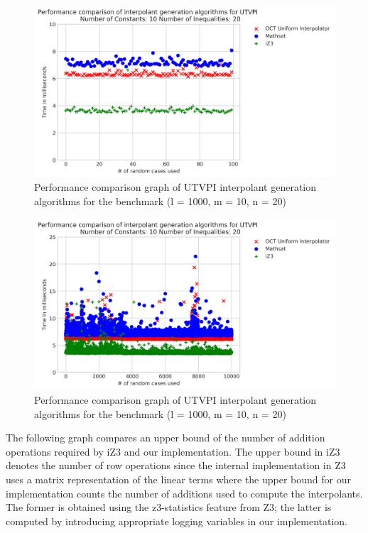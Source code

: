 \begin{figure}[!ht]
  \centering
  \includegraphics[scale=0.6]{figures/octi_performance_graph_10_20_100.png}
  \caption{Performance comparison graph of UTVPI interpolant generation
  algorithms for the benchmark (l = 1000, m = 10, n = 20)} 

  \label{performance_graph_oct_3}
\end{figure}

\begin{figure}[!ht]
  \centering
  \includegraphics[scale=0.6]{figures/octi_performance_graph_10_20_10000.png}
  \caption{Performance comparison graph of UTVPI interpolant generation
  algorithms for the benchmark (l = 1000, m = 10, n = 20)} 

  \label{performance_graph_oct_4}
\end{figure}

The following graph compares an upper bound of the number of 
addition operations required by iZ3 and our implementation. 
The upper bound in iZ3 denotes the number of row 
operations since the
internal implementation in Z3 uses a matrix representation
of the linear terms where the upper bound for our implementation
counts the number of additions used to compute the interpolants.
The former is obtained using the z3-statistics feature
from Z3; the latter is computed by introducing appropriate
logging variables in our implementation.

